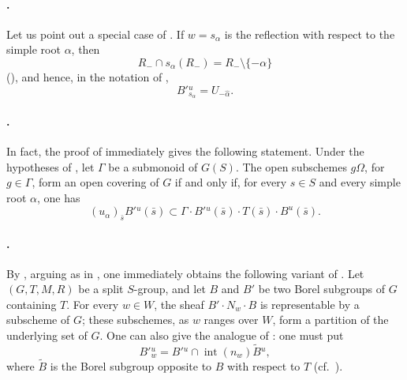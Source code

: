 \paragraph{.}
Let us point out a special case of . If \(w=s_\alpha\) is the
reflection with respect to the simple root \(\alpha\), then
\[
  R_-\cap s_\alpha(R_-)=R_-\setminus\{-\alpha\}
\]
\textup{()}, and hence, in the notation of ,
\[
  B'{}^u_{s_\alpha}=U_{-\widehat\alpha}.
\]

\paragraph{.}
In fact, the proof of  immediately gives the following
statement. Under the hypotheses of , let \(\Gamma\) be a
submonoid of \(G(S)\). The open subschemes \(g\Omega\), for
\(g\in\Gamma\), form an open covering of \(G\) if and only if, for
every \(s\in S\) and every simple root \(\alpha\), one has
\[
  (u_\alpha)_{\bar{s}}B'{}^u(\bar{s})
  \subset
  \Gamma\cdot B'{}^u(\bar{s})\cdot T(\bar{s})\cdot B^u(\bar{s}).
\]

\paragraph{.}
By  \textup{}, arguing as in , one immediately
obtains the following variant of . Let \((G,T,M,R)\) be a
split \(S\)-group, and let \(B\) and \(B'\) be two Borel subgroups
of \(G\) containing \(T\). For every \(w\in W\), the sheaf
\(B'\cdot N_w\cdot B\) is representable by a subscheme of \(G\);
these subschemes, as \(w\) ranges over \(W\), form a partition of
the underlying set of \(G\). One can also give the analogue of
 \textup{}: one must put
\[
  B'{}^u_w
  =
  B'{}^u\cap\operatorname{int}(n_w)\widetilde B{}^u,
\]
where \(\widetilde B\) is the Borel subgroup opposite to \(B\) with
respect to \(T\) \textup{(cf.\ )}.

